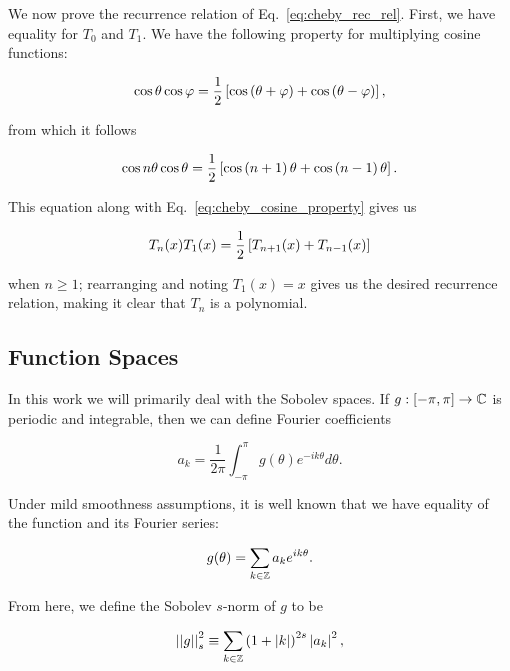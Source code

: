 We now prove the recurrence relation of Eq.~\eqref{eq:cheby_rec_rel}.
First, we have equality for $T_{0}$ and $T_{1}$.
We have the following property for multiplying cosine functions:

\begin{equation}
    \cos\theta\cos\varphi = \frac{1}{2}\left[ \cos\left( \theta+\varphi \right)
        + \cos\left( \theta-\varphi \right) \right],
    \label{eq:cosine_multiplication_prop}
\end{equation}

\noindent
from which it follows

\begin{equation}
    \cos n\theta \cos\theta = \frac{1}{2}\left[ 
        \cos\left( n+1 \right)\theta + \cos\left( n-1 \right)\theta \right].
\end{equation}

\noindent
This equation along with Eq.~\eqref{eq:cheby_cosine_property}
gives us

\begin{equation}
    T_{n}(x)T_{1}(x) = \frac{1}{2}\left[ T_{n+1}(x) + T_{n-1}(x) \right]
\end{equation}

\noindent
when $n\ge1$; rearranging and noting $T_{1}(x) = x$
gives us the desired recurrence relation,
making it clear that $T_{n}$ is a polynomial.



\subsection{Function Spaces}

In this work we will primarily deal with the Sobolev spaces. If
$g:\left[ -\pi,\pi \right]\to\mathbb{C}$ is periodic and integrable, then we can define
Fourier coefficients

\begin{equation}
    a_{k} = \frac{1}{2\pi}\int_{-\pi}^{\pi} g(\theta)e^{-ik\theta}d\theta.
\end{equation}

\noindent
Under mild smoothness assumptions, it is well known that we have equality of
the function and its Fourier series:

\begin{equation}
    g(\theta) = \sum_{k\in\mathbb{Z}} a_{k}e^{ik\theta}.
\end{equation}

\noindent
From here, we define the Sobolev $s$-norm of $g$ to be

\begin{equation}
    \left| \left| g \right| \right|_{s}^{2} \equiv
        \sum_{k\in\mathbb{Z}}\left( 1+\left| k \right| \right)^{2s}\left| a_{k} \right|^{2},
\end{equation}

